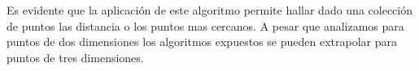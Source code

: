 Es evidente que la aplicación de este algoritmo permite hallar dado una colección de puntos las distancia o los puntos mas cercanos. A pesar que analizamos para puntos de dos dimensiones los algoritmos expuestos se pueden extrapolar para puntos de tres dimensiones. 
